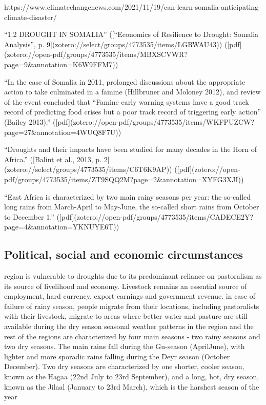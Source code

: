 {{%


https://www.climatechangenews.com/2021/11/19/can-learn-somalia-anticipating-climate-disaster/

“1.2 DROUGHT IN SOMALIA” ([“Economics of Resilience to Drought: Somalia Analysis”, p. 9](zotero://select/groups/4773535/items/LGRWAU43)) ([pdf](zotero://open-pdf/groups/4773535/items/MBXSCVWR?page=9&annotation=K6W9FFM7))


“In the case of Somalia in 2011, prolonged discussions about the appropriate action to take culminated in a famine (Hillbruner and Moloney 2012), and review of the event concluded that “Famine early warning systems have a good track record of predicting food crises but a poor track record of triggering early action” (Bailey 2013).” ([pdf](zotero://open-pdf/groups/4773535/items/WKFPUZCW?page=27&annotation=4WUQ8F7U))

“Droughts and their impacts have been studied for many decades in the Horn of Africa.” ([Balint et al., 2013, p. 2](zotero://select/groups/4773535/items/C6T6K9AP)) ([pdf](zotero://open-pdf/groups/4773535/items/ZT9SQQ2M?page=2&annotation=XYFG3XJI))

“East Africa is characterized by two main rainy seasons per year: the so-called long rains from March-April to May-June, the so-called short rains from October to December 1.” ([pdf](zotero://open-pdf/groups/4773535/items/CADECE2Y?page=4&annotation=YKNUYE6T))


\subsection{Political, social and economic circumstances}
region is vulnerable to droughts due to its predominant reliance on pastoralism as its source of livelihood and economy. Livestock remains an essential source of employment, hard currency, export earnings and government revenue.
in case of failure of rainy season, people migrate from their locations, including pastoralists with their livestock, migrate to areas where better water and pasture are still available during the dry season
seasonal weather patterns in the region and the rest of the regions are characterized by four main seasons - two rainy seasons and two dry seasons. The main rains fall during the Gu-season (AprilJune), with lighter and more sporadic rains falling during the Deyr season (October December). Two dry seasons are characterized by one shorter, cooler season, known as the Hagaa (22nd July to 23rd September), and a long, hot, dry season, known as the Jilaal (January to 23rd March), which is the harshest season of the year


}}
